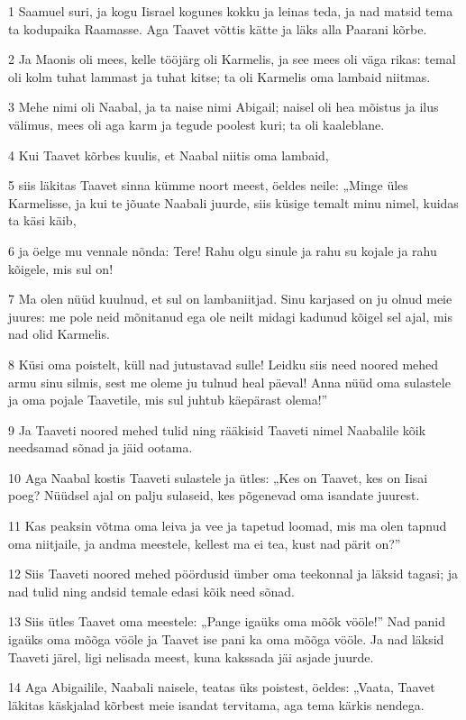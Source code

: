 \par 1 Saamuel suri, ja kogu Iisrael kogunes kokku ja leinas teda, ja nad matsid tema ta kodupaika Raamasse. Aga Taavet võttis kätte ja läks alla Paarani kõrbe.
\par 2 Ja Maonis oli mees, kelle tööjärg oli Karmelis, ja see mees oli väga rikas: temal oli kolm tuhat lammast ja tuhat kitse; ta oli Karmelis oma lambaid niitmas.
\par 3 Mehe nimi oli Naabal, ja ta naise nimi Abigail; naisel oli hea mõistus ja ilus välimus, mees oli aga karm ja tegude poolest kuri; ta oli kaaleblane.
\par 4 Kui Taavet kõrbes kuulis, et Naabal niitis oma lambaid,
\par 5 siis läkitas Taavet sinna kümme noort meest, öeldes neile: „Minge üles Karmelisse, ja kui te jõuate Naabali juurde, siis küsige temalt minu nimel, kuidas ta käsi käib,
\par 6 ja öelge mu vennale nõnda: Tere! Rahu olgu sinule ja rahu su kojale ja rahu kõigele, mis sul on!
\par 7 Ma olen nüüd kuulnud, et sul on lambaniitjad. Sinu karjased on ju olnud meie juures: me pole neid mõnitanud ega ole neilt midagi kadunud kõigel sel ajal, mis nad olid Karmelis.
\par 8 Küsi oma poistelt, küll nad jutustavad sulle! Leidku siis need noored mehed armu sinu silmis, sest me oleme ju tulnud heal päeval! Anna nüüd oma sulastele ja oma pojale Taavetile, mis sul juhtub käepärast olema!”
\par 9 Ja Taaveti noored mehed tulid ning rääkisid Taaveti nimel Naabalile kõik needsamad sõnad ja jäid ootama.
\par 10 Aga Naabal kostis Taaveti sulastele ja ütles: „Kes on Taavet, kes on Iisai poeg? Nüüdsel ajal on palju sulaseid, kes põgenevad oma isandate juurest.
\par 11 Kas peaksin võtma oma leiva ja vee ja tapetud loomad, mis ma olen tapnud oma niitjaile, ja andma meestele, kellest ma ei tea, kust nad pärit on?”
\par 12 Siis Taaveti noored mehed pöördusid ümber oma teekonnal ja läksid tagasi; ja nad tulid ning andsid temale edasi kõik need sõnad.
\par 13 Siis ütles Taavet oma meestele: „Pange igaüks oma mõõk vööle!” Nad panid igaüks oma mõõga vööle ja Taavet ise pani ka oma mõõga vööle. Ja nad läksid Taaveti järel, ligi nelisada meest, kuna kakssada jäi asjade juurde.
\par 14 Aga Abigailile, Naabali naisele, teatas üks poistest, öeldes: „Vaata, Taavet läkitas käskjalad kõrbest meie isandat tervitama, aga tema kärkis nendega.
